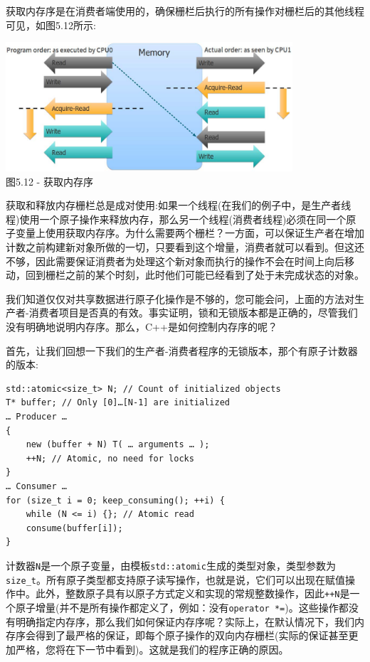 获取内存序是在消费者端使用的，确保栅栏后执行的所有操作对栅栏后的其他线程可见，如图5.12所示:

\begin{center}
\includegraphics[width=0.8\textwidth]{content/1/chapter5/images/12.jpg}\\
图5.12 - 获取内存序
\end{center}

获取和释放内存栅栏总是成对使用:如果一个线程(在我们的例子中，是生产者线程)使用一个原子操作来释放内存，那么另一个线程(消费者线程)必须在同一个原子变量上使用获取内存序。为什么需要两个栅栏？一方面，可以保证生产者在增加计数之前构建新对象所做的一切，只要看到这个增量，消费者就可以看到。但这还不够，因此需要保证消费者为处理这个新对象而执行的操作不会在时间上向后移动，回到栅栏之前的某个时刻，此时他们可能已经看到了处于未完成状态的对象。

我们知道仅仅对共享数据进行原子化操作是不够的，您可能会问，上面的方法对生产者-消费者项目是否真的有效。事实证明，锁和无锁版本都是正确的，尽管我们没有明确地说明内存序。那么，C++是如何控制内存序的呢？


首先，让我们回想一下我们的生产者-消费者程序的无锁版本，那个有原子计数器的版本:

\begin{lstlisting}[style=styleCXX]
std::atomic<size_t> N; // Count of initialized objects
T* buffer; // Only [0]…[N-1] are initialized
… Producer …
{
	new (buffer + N) T( … arguments … );
	++N; // Atomic, no need for locks
}
… Consumer …
for (size_t i = 0; keep_consuming(); ++i) {
	while (N <= i) {}; // Atomic read
	consume(buffer[i]);
}
\end{lstlisting}

计数器\texttt{N}是一个原子变量，由模板\texttt{std::atomic}生成的类型对象，类型参数为\texttt{size\_t}。所有原子类型都支持原子读写操作，也就是说，它们可以出现在赋值操作中。此外，整数原子具有以原子方式定义和实现的常规整数操作，因此\texttt{++N}是一个原子增量(并不是所有操作都定义了，例如：没有\texttt{operator *=})。这些操作都没有明确指定内存序，那么我们如何保证内存序呢？实际上，在默认情况下，我们内存序会得到了最严格的保证，即每个原子操作的双向内存栅栏(实际的保证甚至更加严格，您将在下一节中看到)。这就是我们的程序正确的原因。

